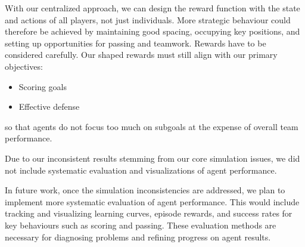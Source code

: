 With our centralized approach, we can design the reward function with the state and actions of all players, not just individuals.
More strategic behaviour could therefore be achieved by maintaining good spacing, occupying key positions, and setting up opportunities for passing and teamwork.
Rewards have to be considered carefully. Our shaped rewards must still align with our primary objectives:
\begin{itemize}
    \item Scoring goals
    \item Effective defense
\end{itemize}
so that agents do not focus too much on subgoals at the expense of overall team performance.

Due to our inconsistent results stemming from our core simulation issues, we did not include systematic evaluation and visualizations of agent performance.

In future work, once the simulation inconsistencies are addressed, we plan to implement more systematic evaluation of agent performance. This would include tracking and visualizing learning curves, episode rewards, and success rates for key behaviours such as scoring and passing. These evaluation methods are necessary for diagnosing problems and refining progress on agent results.
